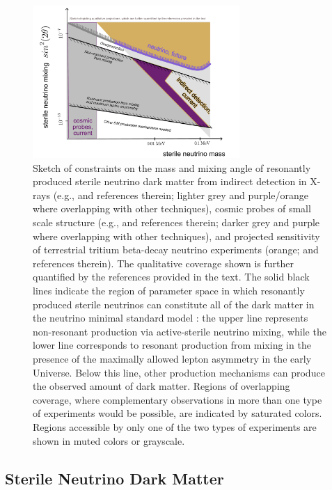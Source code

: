 \documentclass[nofootinbib]{article}
\begin{document}
\begin{figure}[htp]
\begin{center}
\includegraphics[width=0.7\textwidth]{Figures/SterileNeutrino.pdf}
\end{center}
\caption{Sketch of constraints on the mass and mixing angle of resonantly produced sterile neutrino dark matter from indirect detection in X-rays (e.g., \cite{Roach:2022lgo} and references therein; lighter grey and purple/orange where overlapping with other techniques), cosmic probes of small scale structure (e.g., \cite{DES:2020fxi} and references therein; darker grey and purple where overlapping with other techniques), and projected sensitivity of terrestrial tritium beta-decay neutrino experiments (orange; \cite{Merle:2017jfn} and references therein).  The qualitative coverage shown is further quantified by the references provided in the text. The solid black lines indicate the region of parameter space in which resonantly produced sterile neutrinos can constitute all of the dark matter in the neutrino minimal standard model \cite{Schneider:2016uqi,Asaka:2005an}: the upper line represents non-resonant production via active-sterile neutrino mixing, while the lower line corresponds to resonant production from mixing in the presence of the maximally allowed lepton asymmetry in the early Universe. Below this line, other production mechanisms can produce the observed amount of dark matter. 
Regions of overlapping coverage, where complementary observations in more than one type of experiments would be possible, are indicated by saturated colors. Regions accessible by only one of the two types of experiments are shown in muted colors or grayscale.
}
\label{fig:SterileNeutrino}
\end{figure}

\FloatBarrier

\subsection{Sterile Neutrino Dark Matter}
\label{sub:SterileNeutrino}
\end{document}
